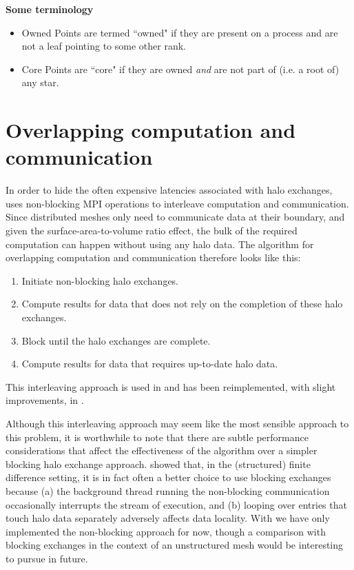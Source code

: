 \documentclass[thesis]{subfiles}
\begin{document}
\textbf{Some terminology}

\begin{itemize}
  \item Owned
    Points are termed ``owned" if they are present on a process and are not a leaf pointing to some other rank.
  \item Core
    Points are ``core" if they are owned \textit{and} are not part of (i.e. a root of) any star.
\end{itemize}


\section{Overlapping computation and communication}

In order to hide the often expensive latencies associated with halo exchanges,  uses non-blocking MPI operations to interleave computation and communication.
Since distributed meshes only need to communicate data at their boundary, and given the surface-area-to-volume ratio effect, the bulk of the required computation can happen without using any halo data.
The algorithm for overlapping computation and communication therefore looks like this:

\begin{enumerate}
  \item Initiate non-blocking halo exchanges.
  \item Compute results for data that does not rely on the completion of these halo exchanges.
  \item Block until the halo exchanges are complete.
  \item Compute results for data that requires up-to-date halo data.
\end{enumerate}

This interleaving approach is used in  and has been reimplemented, with slight improvements, in .

Although this interleaving approach may seem like the most sensible approach to this problem, it is worthwhile to note that there are subtle performance considerations that affect the effectiveness of the algorithm over a simpler blocking halo exchange approach.
\cite{bisbasAutomatedMPICode2023} showed that, in the (structured) finite difference setting, it is in fact often a better choice to use blocking exchanges because
(a) the background thread running the non-blocking communication occasionally interrupts the stream of execution, and
(b) looping over entries that touch halo data separately adversely affects data locality.
With  we have only implemented the non-blocking approach for now, though a comparison with blocking exchanges in the context of an unstructured mesh would be interesting to pursue in future.
\end{document}

